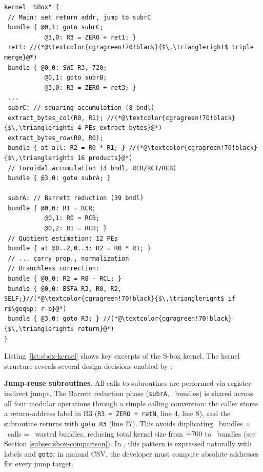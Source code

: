 \noindent\begin{minipage}{\columnwidth}
\begin{lstlisting}[caption={S-box kernel for $x^7 \Mod p$ (key excerpts). \texttt{RCR/RCL/RCT/RCB} denote \textit{Read Cell Right, Left, Top, Bottom}.}, label={lst:sbox-kernel}, breaklines=false, basicstyle=\ttfamily\fontsize{7}{7.7}\selectfont, columns=fullflexible, xleftmargin=1.5mm, numbersep=5pt, aboveskip=3pt, belowskip=1pt]
kernel "SBox" {
 // Main: set return addr, jump to subrC
 bundle { @0,1: goto subrC;
           @3,0: R3 = ZERO + ret1; }
 ret1: //(*@\textcolor{cgragreen!70!black}{$\,\triangleright$ triple merge}@*)
 bundle { @0,0: SWI R3, 720;
           @0,1: goto subrB;
           @3,0: R3 = ZERO + ret3; }
 ...
 subrC: // squaring accumulation (8 bndl)
 extract_bytes_col(R0, R1); //(*@\textcolor{cgragreen!70!black}{$\,\triangleright$ 4 PEs extract bytes}@*)
 extract_bytes_row(R0, R0);
 bundle { at all: R2 = R0 * R1; } //(*@\textcolor{cgragreen!70!black}{$\,\triangleright$ 16 products}@*)
 // Toroidal accumulation (4 bndl, RCR/RCT/RCB)
 bundle { @3,0: goto subrA; }

 subrA: // Barrett reduction (39 bndl)
 bundle { @0,0: R1 = RCR;
           @0,1: R0 = RCB;
           @0,2: R1 = RCB; }
 // Quotient estimation: 12 PEs
 bundle { at @0..2,0..3: R2 = R0 * R1; }
 // ... carry prop., normalization
 // Branchless correction:
 bundle { @0,0: R2 = R0 - RCL; }
 bundle { @0,0: BSFA R3, R0, R2, SELF;}//(*@\textcolor{cgragreen!70!black}{$\,\triangleright$ if r$\geq$p: r-p}@*)
 bundle { @3,0: goto R3; } //(*@\textcolor{cgragreen!70!black}{$\,\triangleright$ return}@*)
}
\end{lstlisting}
\end{minipage}



Listing~\ref{lst:sbox-kernel} shows key excerpts of the S-box kernel.
The kernel structure reveals several design decisions enabled by \castm{}:

\textbf{Jump-reuse subroutines}. All calls to subroutines are performed via register-indirect jumps. The Barrett reduction phase (\texttt{subrA}, \MetricSboxKernelSubrABundles~bundles) is shared across all four modular operations through a simple calling convention: the caller stores a return-address label in R3 (\mbox{\texttt{R3 = ZERO + retN}}, line 4, line 8), and the subroutine returns with \mbox{\texttt{goto R3}} (line 27). This avoids duplicating \MetricSboxKernelSubrABundles~bundles $\times$ \MetricSboxKernelSubrACalls~calls = \MetricSboxKernelSharedBundlesSaved~wasted bundles, reducing total kernel size from ${\sim}700$ to \MetricSboxKernelResidentBundles~bundles (see Section \ref{subsec:sbox-comparison}). In \castm{}, this pattern is expressed naturally with labels and \texttt{goto}; in manual CSV, the developer must compute absolute addresses for every jump target.

